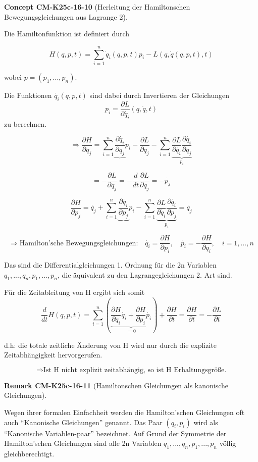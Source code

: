 \documentclass[10pt, letterpaper]{article}
\newcommand{\CustomHeading}[3]{%
  \par\medskip\noindent%
  \textbf{#1 #2} \textnormal{(#3)}.\enskip%
}
\newenvironment{REM}[2]{\CustomHeading{Remark}{#1}{#2}}{}
\newenvironment{CONC}[2]{\CustomHeading{Concept}{#1}{#2}}{}
\begin{document}
\begin{CONC}{CM-K25c-16-10}{Herleitung der Hamiltonschen Bewegungsgleichungen aus Lagrange 2}
Die Hamiltonfunktion ist definiert durch

\[
H(q,p,t) = \sum_{i=1}^n \dot{q}_i(q,p,t)p_i - L(q,\dot{q}(q,p,t),t)
\]

wobei $p=(p_1,...,p_n)$.

Die Funktionen $\dot{q_i}(q,p,t)$ sind dabei durch Invertieren der Gleichungen
\[p_i = \frac{\partial L}{\partial \dot{q_i}}(q,\dot{q},t)\] zu berechnen.

\[\Rightarrow \frac{\partial H}{\partial q_j} = \sum_{i=1}^n \underbrace{\frac{\partial \dot{q_i}}{\partial q_j}}_{} p_i - \frac{\partial L}{\partial q_j} - \sum_{i=1}^n \underbrace{\frac{\partial L}{\partial \dot{q_i}} \frac{\partial \dot{q_i}}{\partial q_j}}_{p_i}\]

\[= -\frac{\partial L}{\partial q_j} = -\frac{d}{dt}\frac{\partial L}{\partial \dot{q_j}} = -\dot{p_j}\]

\[\frac{\partial H}{\partial p_j} = \dot{q_j} + \sum_{i=1}^n \underbrace{\frac{\partial \dot{q_i}}{\partial p_j}}_{} p_i - \sum_{i=1}^n \underbrace{\frac{\partial L}{\partial \dot{q_i}} \frac{\partial \dot{q_i}}{\partial p_j}}_{p_i} = \dot{q_j}\]

\[\Rightarrow \boxed{\text{Hamilton'sche Bewegungsgleichungen:}\quad  \dot{q_i} = \frac{\partial H}{\partial p_i}, \quad \dot{p_i} = -\frac{\partial H}{\partial q_i}, \quad i=1,...,n}\]

Das sind die Differentialgleichungen 1. Ordnung für die 2n Variablen $q_1,...,q_n, p_1,...,p_n$, die äquivalent zu den Lagrangegleichungen 2. Art sind.

Für die Zeitableitung von H ergibt sich somit
\[\frac{d}{dt}H(q,p,t) = \sum_{i=1}^n \left(\underbrace{\frac{\partial H}{\partial q_i}\dot{q_i} + \frac{\partial H}{\partial p_i}\dot{p_i}}_{=0}\right) + \frac{\partial H}{\partial t} = \frac{\partial H}{\partial t} = -\frac{\partial L}{\partial t}\]

d.h: die totale zeitliche Änderung von H wird nur durch die explizite Zeitabhängigkeit hervorgerufen.

\[\Rightarrow \text{Ist H nicht explizit zeitabhängig, so ist H Erhaltungsgröße.}\]
\end{CONC}

\begin{REM}{CM-K25c-16-11}{Hamiltonschen Gleichungen als kanonische Gleichungen}
Wegen ihrer formalen Einfachheit werden die Hamilton'schen Gleichungen oft auch ``Kanonische Gleichungen'' genannt. Das Paar $(q_i, p_i)$ wird als ``Kanonische Variablen-paar'' bezeichnet. Auf Grund der Symmetrie der Hamilton'schen Gleichungen sind alle 2n Variablen $q_1,...,q_n, p_1,...,p_n$ völlig gleichberechtigt.
\end{REM}
\end{document}
